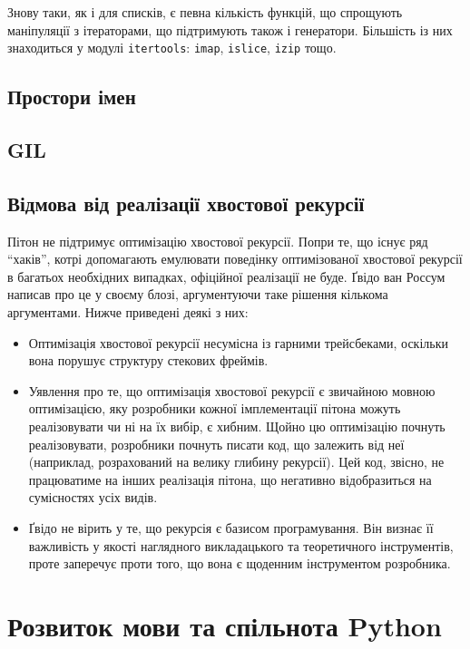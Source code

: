 \documentclass[a4paper, 12pt, onsedie]{article}
\begin{document}
Знову таки, як і для списків, є певна кількість функцій, що спрощують
маніпуляції з ітераторами, що підтримують також і генератори. 
Більшість із них знаходиться у модулі \texttt{itertools}:
\texttt{imap}, \texttt{islice}, \texttt{izip} тощо.

\subsection{Простори імен}

\subsection{GIL}

\subsection{Відмова від реалізації хвостової рекурсії}
Пітон не підтримує оптимізацію хвостової рекурсії. Попри те, що існує ряд ``хаків'', котрі
допомагають емулювати поведінку оптимізованої хвостової рекурсії в багатьох необхідних
випадках, офіційної реалізації не буде. Ґвідо ван Россум написав про це у своєму блозі,
аргументуючи таке рішення кількома аргументами. Нижче приведені деякі з них:
 \begin{itemize}
    \item Оптимізація хвостової рекурсії несумісна із гарними трейсбеками, оскільки вона
    порушує структуру стекових фреймів.
    \item Уявлення про те, що оптимізація хвостової рекурсії є звичайною мовною 
    оптимізацією, яку розробники кожної імплементації пітона можуть реалізовувати чи ні на 
    їх вибір, є хибним. Щойно цю оптимізацію почнуть реалізовувати, розробники почнуть 
    писати код, що залежить від неї (наприклад, розрахований на велику глибину рекурсії). 
    Цей код, звісно, не працюватиме на інших реалізація пітона, що негативно відобразиться 
    на сумісностях усіх видів.
    \item Ґвідо не вірить у те, що рекурсія є базисом програмування. Він визнає її 
    важливість у якості наглядного викладацького та теоретичного інструментів, проте 
    заперечує проти того, що вона є щоденним інструментом розробника.
 \end{itemize}


\section{Розвиток мови та спільнота Python}
\end{document}
